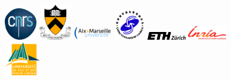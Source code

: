 \documentclass[oneside,english]{book}
\begin{document}
\begin{figure}[htbp]
\noindent \begin{centering}
\includegraphics[width=0.125\textwidth]{figures/logo_cnrs}\vspace*{2truemm}
\includegraphics[width=0.125\textwidth]{figures/logo_princeton}\vspace*{2truemm}
\includegraphics[width=0.15\textwidth]{figures/logo_aix_marseille_universite}\vspace*{0.02truemm}
\includegraphics[width=0.12\textwidth]{figures/logo_CSC_China}\vspace*{0.02truemm}
\includegraphics[width=0.15\textwidth]{figures/logo_ETH}\vspace*{2truemm}
\includegraphics[width=0.15\textwidth]{figures/logo_inria}\vspace*{2truemm}
\includegraphics[width=0.14\textwidth]{figures/logo_UPPA}
\par\end{centering}


\end{figure}
\end{document}
